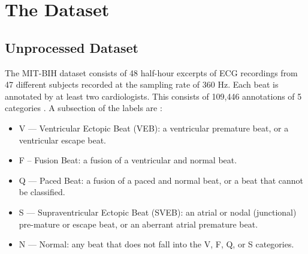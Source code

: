 \documentclass[a4paper,10pt,twocolumn]{article}
\begin{document}






\section{The Dataset}
\subsection{Unprocessed Dataset}
The MIT-BIH dataset consists of 48 half-hour excerpts of ECG recordings from 47 different subjects recorded at the sampling rate of 360 Hz. Each beat is annotated by at least two cardiologists. This consists of 109,446 annotations of 5 categories \cite{moody2001impact}. A subsection of the labels are \cite{Clifford2007ECGA}:

\begin{itemize}
    \setlength\itemsep{0em}
    \item V — Ventricular Ectopic Beat (VEB): a ventricular premature beat, or a ventricular escape beat.
    \item F – Fusion Beat: a fusion of a ventricular and normal beat.
    \item Q — Paced Beat: a fusion of a paced and normal beat, or a beat that cannot be classified.
    \item S — Supraventricular Ectopic Beat (SVEB): an atrial or nodal (junctional) pre-mature or escape beat, or an aberrant atrial premature beat.
    \item N — Normal: any beat that does not fall into the V, F, Q, or S categories.
\end{itemize}
\end{document}
